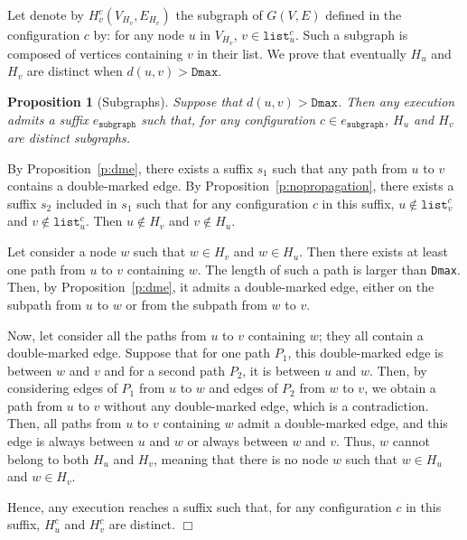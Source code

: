 \documentclass[11pt,english]{article}
\newtheorem{proposition}{Proposition}
\newenvironment{proof}[1][0cm]{
  \begin{list}{\bf Proof.~}{
      \setlength{\itemindent}{0cm}
      \setlength{\labelsep}{0cm}
      \setlength{\labelwidth}{#1}
      \setlength{\leftmargin}{#1}
    \item
    }
}{\hfill$\Box$
  \end{list}
}
\begin{document}
Let denote by $H_v^c(V_{H_v},E_{H_v})$ the subgraph of $G(V,E)$ defined in the
configuration $c$ by: for any node $u$ in $V_{H_v}$, $v \in \texttt{list}_u^c$.
Such a subgraph is composed of vertices containing $v$ in their list. We prove
that eventually $H_u$ and $H_v$ are distinct when $d(u,v) > \texttt{Dmax}$.

\begin{proposition}[Subgraphs]\label{p:subgraphs}
  Suppose that $d(u,v) > \texttt{Dmax}$. Then any execution admits a suffix
  $e_\texttt{subgraph}$ such that, for any configuration $c \in e_\texttt{subgraph}$,
  $H_u$ and $H_v$ are distinct subgraphs.
\end{proposition}

\begin{proof}
  By Proposition~\ref{p:dme}, there exists a suffix $s_1$ such that any path
  from $u$ to $v$ contains a double-marked edge. By
  Proposition~\ref{p:nopropagation}, there exists a suffix $s_2$ included in
  $s_1$ such that for any configuration $c$ in this suffix, $u \not\in
  \texttt{list}_v^c$ and $v \not\in\texttt{list}_u^c$. Then $u \not\in H_v$ and
  $v \not\in H_u$.

  Let consider a node $w$ such that $w \in H_v$ and $w\in H_u$. Then there
  exists at least one path from $u$ to $v$ containing $w$. The length of such a
  path is larger than \texttt{Dmax}. Then, by Proposition~\ref{p:dme}, it
  admits a double-marked edge, either on the subpath from $u$ to $w$ or from the
  subpath from $w$ to $v$.

  Now, let consider all the paths from $u$ to $v$ containing $w$; they all
  contain a double-marked edge. Suppose that for one path $P_1$, this double-marked edge is between $w$ and $v$ and for a second path $P_2$, it is between
  $u$ and $w$. Then, by considering edges of $P_1$ from $u$ to $w$ and edges of
  $P_2$ from $w$ to $v$, we obtain a path from $u$ to $v$ without any double-marked edge, which is a contradiction. Then, all paths from $u$ to $v$
  containing $w$ admit a double-marked edge, and this edge is always between $u$
  and $w$ or always between $w$ and $v$. Thus, $w$ cannot belong to both $H_u$
  and $H_v$, meaning that there is no node $w$ such that $w \in H_u$ and $w\in
  H_v$.

  Hence, any execution reaches a suffix such that, for any configuration $c$ in
  this suffix, $H_u^c$ and $H_v^c$ are distinct.
\end{proof} 
\end{document}
